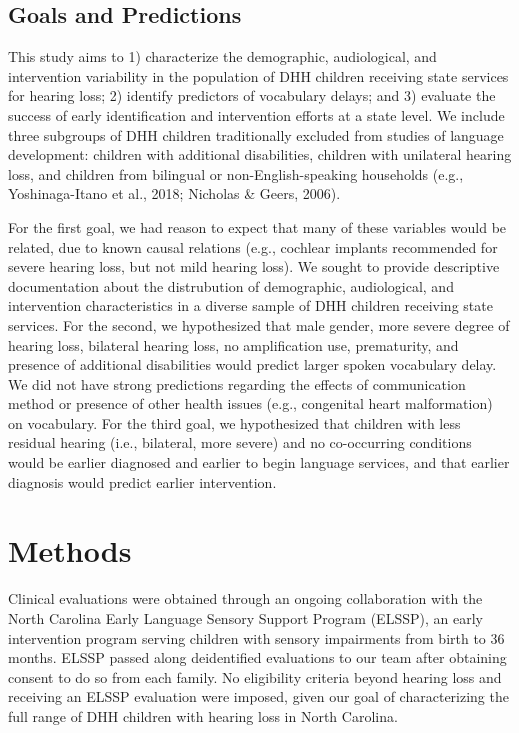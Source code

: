 \documentclass[english,man]{apa6}
\begin{document}
\hypertarget{goals-and-predictions}{%
\subsection{Goals and Predictions}\label{goals-and-predictions}}

This study aims to 1) characterize the demographic, audiological, and intervention variability in the population of DHH children receiving state services for hearing loss; 2) identify predictors of vocabulary delays; and 3) evaluate the success of early identification and intervention efforts at a state level. We include three subgroups of DHH children traditionally excluded from studies of language development: children with additional disabilities, children with unilateral hearing loss, and children from bilingual or non-English-speaking households (e.g., Yoshinaga-Itano et al., 2018; Nicholas \& Geers, 2006).

For the first goal, we had reason to expect that many of these variables would be related, due to known causal relations (e.g., cochlear implants recommended for severe hearing loss, but not mild hearing loss). We sought to provide descriptive documentation about the distrubution of demographic, audiological, and intervention characteristics in a diverse sample of DHH children receiving state services. For the second, we hypothesized that male gender, more severe degree of hearing loss, bilateral hearing loss, no amplification use, prematurity, and presence of additional disabilities would predict larger spoken vocabulary delay. We did not have strong predictions regarding the effects of communication method or presence of other health issues (e.g., congenital heart malformation) on vocabulary. For the third goal, we hypothesized that children with less residual hearing (i.e., bilateral, more severe) and no co-occurring conditions would be earlier diagnosed and earlier to begin language services, and that earlier diagnosis would predict earlier intervention.

\hypertarget{methods}{%
\section{Methods}\label{methods}}

Clinical evaluations were obtained through an ongoing collaboration with the North Carolina Early Language Sensory Support Program (ELSSP), an early intervention program serving children with sensory impairments from birth to 36 months. ELSSP passed along deidentified evaluations to our team after obtaining consent to do so from each family. No eligibility criteria beyond hearing loss and receiving an ELSSP evaluation were imposed, given our goal of characterizing the full range of DHH children with hearing loss in North Carolina.
\end{document}
